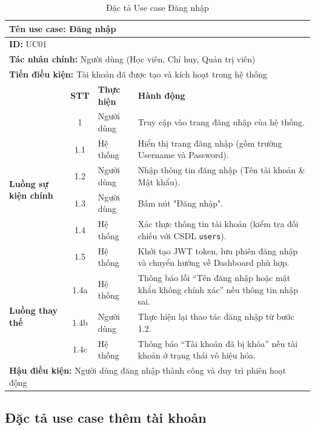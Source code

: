 \documentclass[../DoAn.tex]{subfiles}
\begin{document}
\begin{table}[H]
\centering
\small
\renewcommand{\arraystretch}{1.2}
\begin{tabular}{|p{2.2cm}|c|p{2cm}|p{8.5cm}|}
\hline
\multicolumn{4}{|l|}{\textbf{Tên use case:} Đăng nhập} \\ \hline
\multicolumn{4}{|l|}{\textbf{ID:} UC01} \\ \hline
\multicolumn{4}{|l|}{\textbf{Tác nhân chính:} Người dùng (Học viên, Chỉ huy, Quản trị viên)} \\ \hline
\multicolumn{4}{|l|}{\textbf{Tiền điều kiện:} Tài khoản đã được tạo và kích hoạt trong hệ thống} \\ \hline
 & \textbf{STT} & \textbf{Thực hiện} & \textbf{Hành động} \\ \hline
\multirow{6}{2.2cm}{\textbf{Luồng sự kiện chính}} 
& 1 & Người dùng & Truy cập vào trang đăng nhập của hệ thống. \\ \cline{2-4}
& 1.1 & Hệ thống & Hiển thị trang đăng nhập (gồm trường Username và Password). \\ \cline{2-4}
& 1.2 & Người dùng & Nhập thông tin đăng nhập (Tên tài khoản \& Mật khẩu). \\ \cline{2-4}
& 1.3 & Người dùng & Bấm nút "Đăng nhập". \\ \cline{2-4}
& 1.4 & Hệ thống & Xác thực thông tin tài khoản (kiểm tra đối chiếu với CSDL \texttt{users}). \\ \cline{2-4}
& 1.5 & Hệ thống & Khởi tạo JWT token, lưu phiên đăng nhập và chuyển hướng về Dashboard phù hợp. \\ \hline
\multirow{3}{2.2cm}{\textbf{Luồng thay thế}} 
& 1.4a & Hệ thống & Thông báo lỗi ``Tên đăng nhập hoặc mật khẩu không chính xác'' nếu thông tin nhập sai. \\ \cline{2-4}
& 1.4b & Người dùng & Thực hiện lại thao tác đăng nhập từ bước 1.2. \\ \cline{2-4}
& 1.4c & Hệ thống & Thông báo ``Tài khoản đã bị khóa'' nếu tài khoản ở trạng thái vô hiệu hóa. \\ \hline
\multicolumn{4}{|l|}{\textbf{Hậu điều kiện:} Người dùng đăng nhập thành công và duy trì phiên hoạt động} \\ \hline
\end{tabular}
\caption{Đặc tả Use case Đăng nhập}
\label{table:uc_login}
\end{table}


\subsection{Đặc tả use case thêm tài khoản}
\hfill
\end{document}
